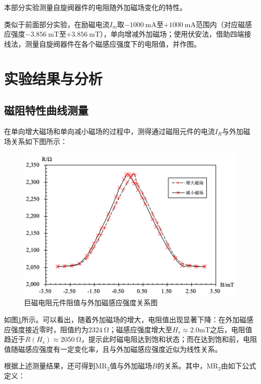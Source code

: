 \documentclass{thuemp}
\begin{document}
本部分实验测量自旋阀器件的电阻随外加磁场变化的特性。

类似于前面部分实验，在励磁电流$I_m$取$-1000 ~ \mathrm{mA} $至$+1000~ \mathrm{mA} $范围内（对应磁感应强度$-3.856 ~ $\si{\milli\tesla}至$+3.856 ~ $\si{\milli\tesla}），单向增减外加磁场；使用伏安法，借助四端接线法，测量自旋阀器件在各个磁感应强度下的电阻值，并作图。


\section{实验结果与分析}

\subsection{磁阻特性曲线测量}

在单向增大磁场和单向减小磁场的过程中，测得通过磁阻元件的电流$I_R$与外加磁场关系如下图所示：

\begin{figure}[H]
    \centering
    \includegraphics[width=0.9\linewidth]{../Data/GMR-Plot-01-01-excel.png}
    \caption{巨磁电阻元件阻值与外加磁感应强度关系图} \label{fig:magnetoresistance}
\end{figure}

如图\ref{fig:magnetoresistance}所示。可以看出，随着外加磁场的增大，电阻值出现显著下降：在外加磁感应强度接近零时，阻值约为$2324~$\si{\ohm}；磁感应强度增大至$H_s \approx 2.0$\si{\milli\tesla}之后，电阻值趋近于$R(H_s)\approx 2050~$\si{\ohm}，提示此时磁电阻达到饱和状态；而在达到饱和前，电阻值随磁感应强度有一定变化率，且与外加磁感应强度近似为线性关系。

根据上述测量结果，还可得到$\mathrm{MR_2}$值与外加磁场$B$的关系。其中，$\mathrm{MR_2}$由如下公式定义：
\end{document}
